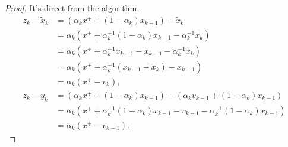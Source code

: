 \documentclass[12pt]{report}
\begin{document}
        \begin{proof}
            It's direct from the algorithm. 
            \begin{align*}
                z_k - \tilde x_k &= (\alpha_k x^+ + (1 - \alpha_k)x_{k - 1}) - \tilde x_k
                \\
                &= \alpha_k (x^+ + \alpha_k^{-1}(1 - \alpha_k)x_{k - 1} - \alpha_k^{-1}\tilde x_k)
                \\
                &= \alpha_k(x^+ + \alpha_k^{-1}x_{k - 1} - x_{k - 1} - \alpha_k^{-1}\tilde x_k)
                \\
                &= \alpha_k(x^+ + \alpha_k^{-1}(x_{k - 1} - \tilde x_k) - x_{k - 1})
                \\
                &= \alpha_k(x^+ - v_{k}), 
                \\
                z_k - y_k &= 
                (\alpha_k x^+ + (1 - \alpha_k)x_{k - 1}) - \left(
                    \alpha_k v_{k - 1} + (1 - \alpha_k)x_{k - 1}
                \right)
                \\
                &= \alpha_k(x^+ + \alpha_k^{-1}(1 - \alpha_k)x_{k - 1} - v_{k - 1} - \alpha_k^{-1}(1 - \alpha_k)x_{k - 1})
                \\
                &= \alpha_k(x^+ - v_{k - 1}). 
            \end{align*}
        \end{proof}
\end{document}
